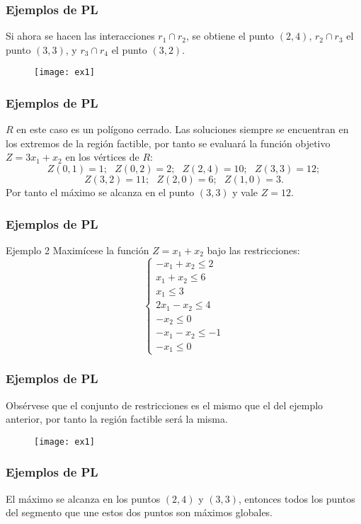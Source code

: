 \documentclass{beamer}
\begin{document}
\begin{frame}
\frametitle{Ejemplos de PL}
Si ahora se hacen las interacciones $r_1\cap r_2$, se obtiene el punto $(2,4)$, $r_2\cap r_3$ el punto $(3,3)$, y $r_3\cap r_4$ el punto $(3,2)$.
\begin{figure}[h]
\label{fig:ejemplo 1}
\centering
\texttt{[image: ex1]}
\end{figure}
\end{frame}


\begin{frame}
\frametitle{Ejemplos de PL}
$R$ en este caso es un pol\'igono cerrado. Las soluciones siempre se encuentran en los extremos de la regi\'on factible, por tanto se evaluar\'a la funci\'on objetivo $Z=3x_1+x_2$ en los v\'ertices de $R$:
\[Z(0,1) = 1;\ \ \ Z(0,2) = 2;\ \ \ Z(2,4) = 10;\ \ \ Z(3,3) = 12;\]
\[Z(3,2) = 11;\ \ \ Z(2,0) = 6;\ \ \ Z(1,0) = 3.\]
Por tanto el m\'aximo se alcanza en el punto $(3,3)$ y vale $Z=12$.
\end{frame}



\begin{frame}
\frametitle{Ejemplos de PL}
\begin{block}{Ejemplo 2}
Maxim\'icese la funci\'on $Z=x_1+x_2$ bajo las restricciones:
\[\left\{\begin{array}{l}-x_1 + x_2 \leq 2 \\x_1+x_2\leq 6 \\x_1\leq 3 \\2x_1-x_2\leq 4 \\-x_2\leq 0 \\-x_1-x_2\leq -1 \\-x_1\leq 0\end{array}\right.\]
\end{block}
\end{frame}


\begin{frame}
\frametitle{Ejemplos de PL}
Obs\'ervese que el conjunto de restricciones es el mismo que el del ejemplo anterior, por tanto la regi\'on factible ser\'a la misma.
 \begin{figure}[h]
\label{fig:ejemplo 2}
\centering
\texttt{[image: ex1]}
\end{figure}
\end{frame}





\begin{frame}
\frametitle{Ejemplos de PL}
El m\'aximo se alcanza en los puntos $(2,4)$ y $(3,3)$, entonces todos los puntos del segmento que une estos dos puntos son m\'aximos globales.
\end{frame}
\end{document}
